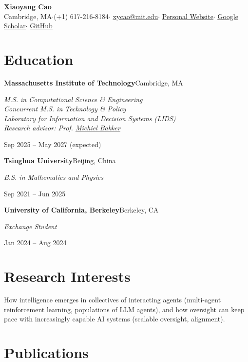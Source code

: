 \documentclass[10pt,letterpaper]{article}
\newcommand{\ulink}[2]{\href{#1}{\underline{#2}}}           %
\newcommand{\Bakker}{\ulink{https://miba.dev/}{Michiel Bakker}}
\newcommand{\sep}{\unskip\hspace{0.55em}$\cdot$\hspace{0.55em}\ignorespaces}
\newcommand{\school}[4]{%
  \textbf{#1}\hfill #2\\
  \begin{minipage}[t]{0.68\textwidth}\itshape #3\end{minipage}%
  \hfill\begin{minipage}[t]{0.3\textwidth}\raggedleft #4\end{minipage}\par\vspace{5pt}}
\begin{document}
\begin{center}
  {\fontsize{17.2}{20}\selectfont\bfseries Xiaoyang Cao}\\[4pt]
  Cambridge, MA\sep (+1) 617-216-8184\sep
  \ulink{mailto:xycao@mit.edu}{xycao@mit.edu}\sep
  \ulink{https://xiaoyangcao1113.github.io/}{Personal Website}\sep
  \ulink{https://scholar.google.com/citations?user=XVWuYHAAAAAJ}{Google Scholar}\sep
  \ulink{https://github.com/XiaoyangCao1113}{GitHub}
\end{center}
\vspace{-6pt}

\section{Education}

\school{Massachusetts Institute of Technology}{Cambridge, MA}
  {M.S. in Computational Science \& Engineering\\
   Concurrent M.S. in Technology \& Policy\\
   Laboratory for Information and Decision Systems (LIDS)\\
   Research advisor: Prof. \Bakker}
  {Sep 2025 -- May 2027 (expected)}

\school{Tsinghua University}{Beijing, China}
  {B.S. in Mathematics and Physics}
  {Sep 2021 -- Jun 2025}

\school{University of California, Berkeley}{Berkeley, CA}
  {Exchange Student}
  {Jan 2024 -- Aug 2024}

\section{Research Interests}

How intelligence emerges in collectives of interacting agents (multi-agent reinforcement learning, populations of LLM agents), and how oversight can keep pace with increasingly capable AI systems (scalable oversight, alignment).

\section{Publications}
\end{document}
